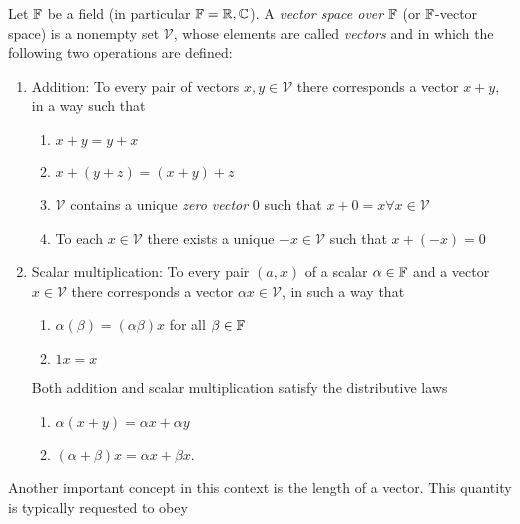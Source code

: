 \begin{definition}
	Let $\mathbb{F}$ be a field (in particular $\mathbb{F} = \mathbb{R},\mathbb{C}$). A \emph{vector space
	over} $\mathbb{F}$ (or $\mathbb{F}$-vector space) is a nonempty set $\mathcal{V}$, whose
	elements are called \emph{vectors} and in which the following two operations
	are defined:
	\begin{enumerate}
		\item Addition: To every pair of vectors $x, y \in \mathcal{V}$ there
		corresponds a vector $x + y$, in a way such that
		\begin{enumerate}[label=(\alph*)]
			\item $x + y = y + x$
			\item $x + \left(y + z\right) = \left(x + y\right) + z$
			\item $\mathcal{V}$ contains a unique \emph{zero vector} $0$ such
			that $x + 0 = x \forall x \in \mathcal{V}$
			\item To each $x \in \mathcal{V}$ there exists a unique
			$-x \in \mathcal{V}$ such that $x + \left(-x\right) = 0$
		\end{enumerate}
		\item Scalar multiplication: To every pair $(a, x)$ of a scalar
		$\alpha \in \mathbb{F}$ and a vector $x \in \mathcal{V}$ there corresponds a
		vector $\alpha x \in \mathcal{V}$, in such a way that
		\begin{enumerate}[label=(\alph*), start = 5]
			\item $\alpha \left(\beta\right) = \left(\alpha \beta\right) x$ for
			all $\beta \in \mathbb{F}$ 
			\item $1 x = x$
		\end{enumerate}
		Both addition and scalar multiplication satisfy the distributive laws
		\begin{enumerate}[label=(\alph*), start = 7]
			\item $\alpha \left(x + y\right) = \alpha x + \alpha y$
			\item $\left(\alpha + \beta\right) x = \alpha x + \beta x$.
		\end{enumerate}
	\end{enumerate}
\end{definition}
Another important concept in this context is the length of a vector.
This quantity is typically requested to obey
